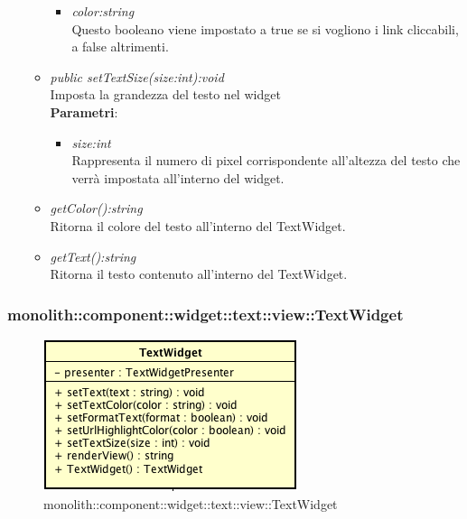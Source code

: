\begin{itemize}
\begin{itemize}
\begin{itemize}
		\item \textit{color:string}\\
		Questo booleano viene impostato a true se si vogliono i link cliccabili, a false altrimenti.
		\end{itemize} 
	\item \textit{public setTextSize(size:int):void}\\
	Imposta la grandezza del testo nel widget
		\\ \textbf{Parametri}: \begin{itemize}
		\item \textit{size:int}\\
		Rappresenta il numero di pixel corrispondente all'altezza del testo che verrà impostata all'interno del widget.
		\end{itemize} 
	\item \textit{getColor():string}\\
	Ritorna il colore del testo all'interno del TextWidget.
	\item \textit{getText():string}\\
	Ritorna il testo contenuto all'interno del TextWidget.
	\end{itemize}
\end{itemize}

\subsubsection{monolith::component::widget::text::view::TextWidget}

\label{monolith::component::widget::text::view::TextWidget}
\begin{figure}[H]
	\centering
	\includegraphics[scale=0.5]{Sezioni/SottosezioniST/img/TextWidget.png}
	\caption{monolith::component::widget::text::view::TextWidget}
\end{figure}

